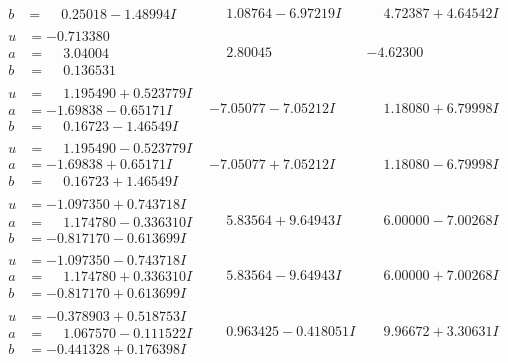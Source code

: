 \documentclass[1p]{elsarticle_modified}
\theoremstyle{definition}
\begin{document}
$$\begin{array}{c|c|c}
\begin{aligned}
b &= \phantom{-}0.25018 - 1.48994 I\end{aligned}
 & \phantom{-}1.08764 - 6.97219 I & \phantom{-}4.72387 + 4.64542 I \\ \hline\begin{aligned}
u &= -0.713380\phantom{ +0.000000I} \\
a &= \phantom{-}3.04004\phantom{ +0.000000I} \\
b &= \phantom{-}0.136531\phantom{ +0.000000I}\end{aligned}
 & \phantom{-}2.80045\phantom{ +0.000000I} & -4.62300\phantom{ +0.000000I} \\ \hline\begin{aligned}
u &= \phantom{-}1.195490 + 0.523779 I \\
a &= -1.69838 - 0.65171 I \\
b &= \phantom{-}0.16723 - 1.46549 I\end{aligned}
 & -7.05077 - 7.05212 I & \phantom{-}1.18080 + 6.79998 I \\ \hline\begin{aligned}
u &= \phantom{-}1.195490 - 0.523779 I \\
a &= -1.69838 + 0.65171 I \\
b &= \phantom{-}0.16723 + 1.46549 I\end{aligned}
 & -7.05077 + 7.05212 I & \phantom{-}1.18080 - 6.79998 I \\ \hline\begin{aligned}
u &= -1.097350 + 0.743718 I \\
a &= \phantom{-}1.174780 - 0.336310 I \\
b &= -0.817170 - 0.613699 I\end{aligned}
 & \phantom{-}5.83564 + 9.64943 I & \phantom{-}6.00000 - 7.00268 I \\ \hline\begin{aligned}
u &= -1.097350 - 0.743718 I \\
a &= \phantom{-}1.174780 + 0.336310 I \\
b &= -0.817170 + 0.613699 I\end{aligned}
 & \phantom{-}5.83564 - 9.64943 I & \phantom{-}6.00000 + 7.00268 I \\ \hline\begin{aligned}
u &= -0.378903 + 0.518753 I \\
a &= \phantom{-}1.067570 - 0.111522 I \\
b &= -0.441328 + 0.176398 I\end{aligned}
 & \phantom{-}0.963425 - 0.418051 I & \phantom{-}9.96672 + 3.30631 I \\ \hline\begin{aligned}

\end{aligned}
\end{array}$$
\end{document}

